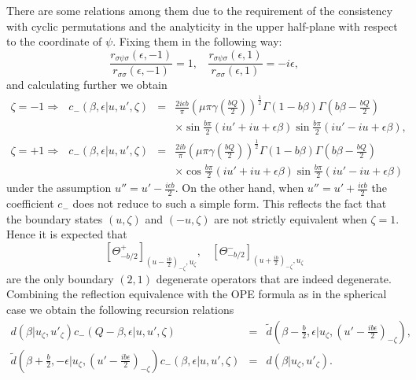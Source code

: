 \documentclass[a4paper,12pt]{article}
\newcommand{\tfrac}[2]{{\textstyle\frac{#1}{#2}}}
\newcommand{\ep}{{\epsilon}}
\begin{document}
 There are some relations among them due to the requirement of
 the consistency with cyclic permutations and the analyticity
 in the upper half-plane with respect to the coordinate of $\psi$.
 Fixing them in the following way:
\begin{equation}
  \frac{r_{\sigma\psi\sigma}(\ep,-1)}{r_{\sigma\sigma}(\ep,-1)}  =1,~~~~
  \frac{r_{\sigma\psi\sigma}(\ep,1)}{r_{\sigma\sigma}(\ep,1)}  =-i\ep,
\end{equation}
 and calculating further we obtain
\begin{eqnarray}
 \zeta=-1 \Rightarrow ~~~
  c_-(\beta,\ep|u,u',\zeta)
   &=& \frac{2i\ep b}{\pi}
      (\mu\pi\gamma(\tfrac{bQ}{2}))^{\frac{1}{2}}
      \Gamma(1-b\beta)\Gamma(b\beta-\tfrac{bQ}{2})
 \nonumber \\ && \times
      \sin\tfrac{b\pi}{2}(iu'+iu+\ep\beta)
      \sin\tfrac{b\pi}{2}(iu'-iu+\ep\beta),
 \nonumber \\
 \zeta=+1 \Rightarrow ~~~
  c_-(\beta,\ep|u,u',\zeta)
   &=& \frac{2i b}{\pi}
      (\mu\pi\gamma(\tfrac{bQ}{2}))^{\frac{1}{2}}
      \Gamma(1-b\beta)\Gamma(b\beta-\tfrac{bQ}{2})
 \nonumber \\ && \times
      \cos\tfrac{b\pi}{2}(iu'+iu+\ep\beta)
      \sin\tfrac{b\pi}{2}(iu'-iu+\ep\beta)
\end{eqnarray}
 under the assumption $u''=u'-\frac{i\ep b}{2}$.
 On the other hand, when $u''=u'+\frac{i\ep b}{2}$ the coefficient
 $c_-$ does not reduce to such a simple form.
 This reflects the fact that the boundary states $(u,\zeta)$
 and $(-u,\zeta)$ are not strictly equivalent when $\zeta=1$.
 Hence it is expected that
\begin{equation}
  \left[\Theta_{-b/2}^+\right]_{(u-\frac{ib}{2})_{-\zeta},u_\zeta},~~~~
  \left[\Theta_{-b/2}^-\right]_{(u+\frac{ib}{2})_{-\zeta},u_\zeta}
\label{bSdg}
\end{equation}
 are the only boundary $(2,1)$ degenerate operators
 that are indeed degenerate.
 Combining the reflection equivalence with the OPE formula as in the
 spherical case we obtain the following recursion relations
\begin{eqnarray}
  d(\beta|u_\zeta,u'_\zeta)c_-(Q-\beta,\ep|u,u',\zeta)
 &=& \tilde{d}(\beta-\tfrac{b}{2},\ep|u_\zeta,(u'-\tfrac{ib\ep}{2})_{-\zeta}),
 \nonumber \\
 \tilde{d}(\beta+\tfrac{b}{2},-\ep|u_\zeta, (u'-\tfrac{ib\ep}{2})_{-\zeta})
 c_-(\beta,\ep|u,u',\zeta)
 &=& d(\beta|u_\zeta,u'_\zeta).
\label{rcd1}
\end{eqnarray}
\end{document}
